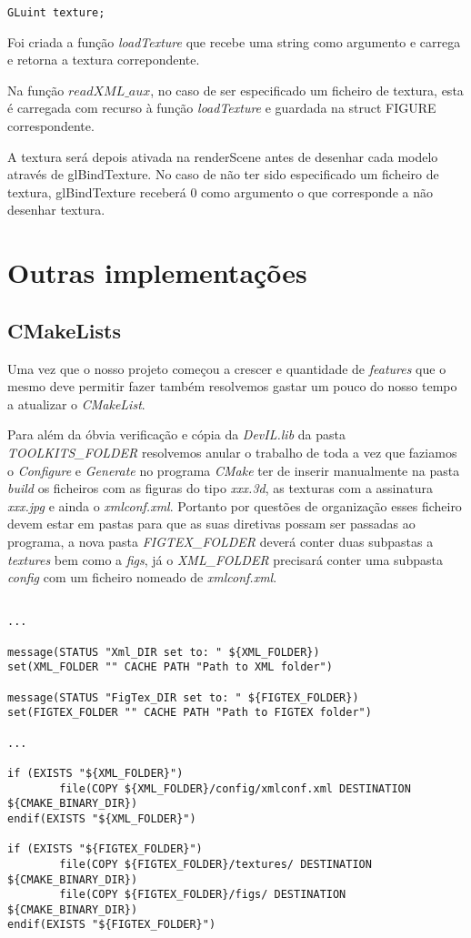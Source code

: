 \documentclass[11pt,a4paper]{report}
\begin{document}
\begin{lstlisting}[style = code]
GLuint texture;
\end{lstlisting}

Foi criada a função \emph{loadTexture} que recebe uma string como argumento e carrega e retorna a textura correpondente.

Na função {$readXML\_aux$}, no caso de ser especificado um ficheiro de textura, esta é carregada com recurso à função \emph{loadTexture} e guardada na struct FIGURE correspondente.

A textura será depois ativada na renderScene antes de desenhar cada modelo através de glBindTexture. No caso de não ter sido especificado um ficheiro de textura, glBindTexture receberá 0 como argumento o que corresponde a não desenhar textura.

\section{Outras implementações}

\subsection{CMakeLists}

Uma vez que o nosso projeto começou a crescer e quantidade de \emph{features} que o mesmo deve permitir fazer também resolvemos gastar um pouco do nosso tempo a atualizar o \emph{CMakeList}. 

Para além da óbvia verificação e cópia da \emph{DevIL.lib} da pasta \emph{TOOLKITS\_FOLDER} resolvemos anular o trabalho de toda a vez que faziamos o \emph{Configure} e \emph{Generate} no programa \emph{CMake} ter de inserir manualmente na pasta \emph{build} os ficheiros com as figuras do tipo \emph{xxx.3d}, as texturas com a assinatura \emph{xxx.jpg} e ainda o \emph{xmlconf.xml}. Portanto por questões de organização esses ficheiro devem estar em pastas para que as suas diretivas possam ser passadas ao programa, a nova pasta \emph{FIGTEX\_FOLDER} deverá conter duas subpastas a \emph{textures} bem como a \emph{figs}, já o \emph{XML\_FOLDER} precisará conter uma subpasta \emph{config} com um ficheiro nomeado de \emph{xmlconf.xml}.
\begin{lstlisting}[style = cmake]

...

message(STATUS "Xml_DIR set to: " ${XML_FOLDER})
set(XML_FOLDER "" CACHE PATH "Path to XML folder")

message(STATUS "FigTex_DIR set to: " ${FIGTEX_FOLDER})
set(FIGTEX_FOLDER "" CACHE PATH "Path to FIGTEX folder")

...

if (EXISTS "${XML_FOLDER}")
		file(COPY ${XML_FOLDER}/config/xmlconf.xml DESTINATION ${CMAKE_BINARY_DIR})
endif(EXISTS "${XML_FOLDER}")

if (EXISTS "${FIGTEX_FOLDER}")
	    file(COPY ${FIGTEX_FOLDER}/textures/ DESTINATION ${CMAKE_BINARY_DIR})
	    file(COPY ${FIGTEX_FOLDER}/figs/ DESTINATION ${CMAKE_BINARY_DIR})
endif(EXISTS "${FIGTEX_FOLDER}")

\end{lstlisting}
\end{document}
